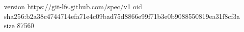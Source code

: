 version https://git-lfs.github.com/spec/v1
oid sha256:b2a38c4744714efa71e4c09bad75d8866e99f71b3e0b9088550819ea31f8cf3a
size 87560
